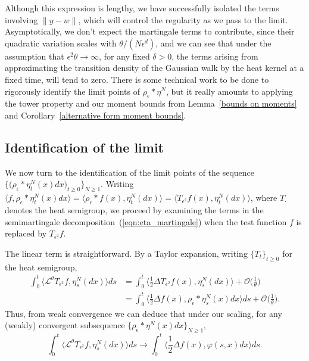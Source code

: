 \documentclass[12pt]{article}
\numberwithin{equation}{section}
\begin{document}
Although this expression is lengthy, we have successfully isolated the
terms involving $\|y-w\|$, which will control the regularity as we pass to the
limit. Asymptotically, we 
don't expect the martingale terms to contribute, since their 
quadratic variation scales with $\theta/(N\epsilon^d)$, and we can see that 
under the assumption that $\epsilon^2\theta\to\infty$, for any fixed $\delta>0$,
the terms arising from 
approximating the transition 
density of the Gaussian 
walk by the heat kernel at a fixed time, will tend to zero. 
There is some technical work to be done to rigorously identify the
limit points of $\rho_\epsilon*\eta^N$, but 
it really amounts to 
applying the tower property and our moment bounds from 
Lemma~\ref{bounds on moments} and 
Corollary~\ref{alternative form moment bounds}.


\subsection{Identification of the limit}
\label{limit in onestep case}


We now turn to the identification of the limit points of the sequence 
$\big\{\big(\rho_\epsilon*\eta_t^N(x)dx\big)_{t\geq 0}\big\}_{N\geq 1}$.
Writing
$\langle f, \rho_\epsilon*\eta_t^N(x)dx\rangle=
\langle \rho_\epsilon*f(x), \eta_t^N(dx)\rangle
=\langle T_{\epsilon^2}f(x),\eta_t^N(dx)\rangle$,
where $T_{\cdot}$ denotes the heat semigroup, we proceed
by examining the terms in the semimartingale
decomposition~(\ref{eqn:eta_martingale})
when the test function $f$ is replaced by $T_{\epsilon^2}f$.

The linear term is straightforward.
By a Taylor expansion, writing $\{T_t\}_{t\geq 0}$ for the heat semigroup,
\begin{align*}
\int_0^t \big\langle \mathcal{L}^\theta T_{\epsilon^2} f, 
	\eta_s^N(dx)\big\rangle ds 
&= \int_0^t \big\langle \frac{1}{2} \Delta T_{\epsilon^2} f(x), 
	\eta_s^N(dx) \big\rangle 
	+ \mathcal{O}\Big(\frac{1}{\theta}\Big) 
\\ &= \int_0^t \big\langle \frac{1}{2} \Delta f(x), \rho_\epsilon* \eta_s^N(x) dx 
	\big\rangle ds + \mathcal{O}\Big(\frac{1}{\theta}\Big).
\end{align*}
Thus, from weak convergence we can deduce that under our scaling,
for any (weakly) convergent subsequence $\{\rho_\epsilon*\eta^N(x)dx\}_{N\geq 1}$,
\[ 
\int_0^t \big\langle \mathcal{L}^\theta T_{\epsilon^2} f, 
\eta_s^N(dx)\big\rangle ds 
\rightarrow \int_0^t \big\langle \frac{1}{2} \Delta f(x), 
\varphi (s,x) dx \big\rangle ds. 
\]
\end{document}
